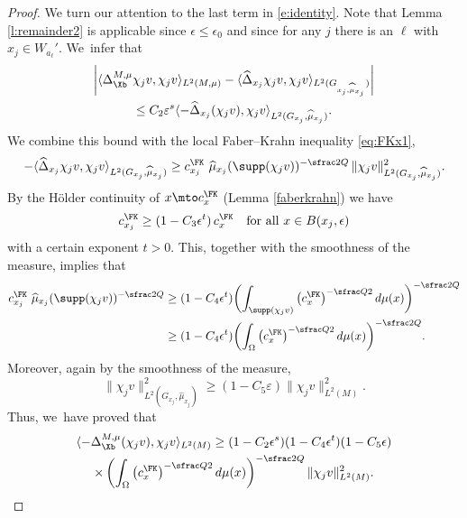 \begin{proof}
We turn our attention to the last term in \eqref{e:identity}. Note that Lemma \ref{l:remainder2} is applicable since $\epsilon\leq\epsilon_0$ and since for any $j$ there is an $\ell$ with $x_j\in W_{a_\ell}'$. We~infer that
\begin{multline*}
\left| \langle \Delta^{M,\mu}_\Xb \chi_j v, \chi_j v \rangle_{L^2(M,\mu)} - \langle \widehat{\Delta}_{x_j} \chi_j v, \chi_j v \rangle_{L^2(G_{x_j,\widehat\mu_{x_j}})}\right| \\
\leq C_2 \varepsilon^{s} \langle - \widehat{\Delta}_{x_j} (\chi_j v), \chi_j v \rangle_{L^2(G_{x_j},\widehat\mu_{x_j})}.
\end{multline*}
We combine this bound with the local Faber--Krahn inequality \eqref{eq:FKx1},
\begin{equation}
- \langle \widehat \Delta_{x_j}\chi_jv, \chi_jv \rangle_{L^2(G_{x_j},\widehat\mu_{x_j})} \geq c^\FK_{x_j} \ \widehat\mu_{x_j}(\supp (\chi_j v))^{-\sfrac2Q} \,\|\chi_j v \|_{L^2(G_{x_j},\widehat\mu_{x_j})}^2.
\end{equation}
By the Hölder continuity of $x\mto c^\FK_x$ (Lemma \ref{faberkrahn}) we have
\[
c_{x_j}^\FK \geq (1-C_3 \epsilon^t) \,c_x^\FK
\quad\text{for all} \ x\in B(x_j,\epsilon)
\]
with a certain exponent $t>0$. This, together with the smoothness of the measure, implies that
\begin{align*}
c^\FK_{x_j} \ \widehat\mu_{x_j}(\supp (\chi_j v))^{-\sfrac2Q}
& \geq (1-C_4 \epsilon^t) \biggl(\int_{\supp(\chi_j v)} \left(c^\FK_x\right)^{-\sfrac Q2} d\mu(x) \biggr)^{-\sfrac 2Q} \\
& \geq (1-C_4 \epsilon^t) \biggl(\int_\Omega \left(c^\FK_x\right)^{-\sfrac Q2} d\mu(x) \biggr)^{-\sfrac 2Q}.
\end{align*}
Moreover, again by the smoothness of the measure,
\[
\|\chi_j v \|_{L^2(G_{x_j},\widehat\mu_{x_j})}^2 \geq (1-C_5 \varepsilon) \|\chi_j v \|_{L^2(M)}^2.
\]
Thus, we~have proved that
\begin{multline*}
\langle -\Delta^{M,\mu}_\Xb (\chi_j v),\chi_j v \rangle_{L^2(M)}\geq (1-C_2 \epsilon^s)(1-C_4 \epsilon^t) (1-C_5\epsilon) \\
\times
\left(\int_\Omega \left(c^\FK_x\right)^{-\sfrac Q2} d\mu(x)\right)^{-\sfrac 2Q}
\|\chi_j v \|_{L^2(M)}^2.
\end{multline*}


\end{proof}
